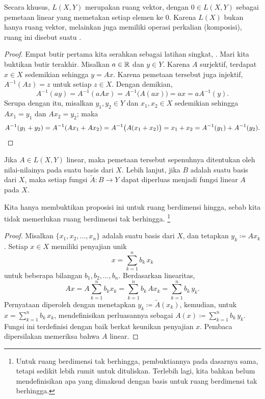 Secara khusus, $L(X,Y)$ merupakan ruang vektor, dengan $0 \in L(X,Y)$ sebagai
pemetaan linear yang memetakan setiap elemen ke $0$.
Karena $L(X)$ bukan hanya ruang vektor, melainkan juga
memiliki operasi perkalian (komposisi),
ruang ini disebut suatu \emph{}.

\begin{proof}
Empat butir pertama kita serahkan sebagai latihan singkat,
.
Mari kita buktikan butir terakhir.
Misalkan $a \in {\mathbb{R}}$ dan $y \in Y$.  Karena $A$ surjektif, terdapat 
$x \in X$ sedemikian sehingga $y = Ax$.
Karena pemetaan tersebut juga injektif, $A^{-1}(Az) = z$ untuk setiap $z \in X$.
Dengan demikian,
\begin{equation*}
A^{-1}(ay)
=
A^{-1}(aAx)
=
A^{-1}\bigl(A(ax)\bigr)
= ax
= aA^{-1}(y).
\end{equation*}
Serupa dengan itu, misalkan $y_1,y_2 \in Y$ dan $x_1, x_2 \in X$ sedemikian sehingga
$Ax_1 = y_1$ dan 
$Ax_2 = y_2$; maka
\begin{equation*}
A^{-1}(y_1+y_2)
=
A^{-1}(Ax_1+Ax_2)
=
A^{-1}\bigl(A(x_1+x_2)\bigr)
= x_1+x_2
= A^{-1}(y_1) + A^{-1}(y_2). \qedhere
\end{equation*}
\end{proof}

\begin{prop} \label{mv:lindefonbasis}
Jika $A \in L(X,Y)$ linear, maka pemetaan tersebut sepenuhnya ditentukan
oleh nilai-nilainya pada suatu basis dari $X$.
Lebih lanjut, jika $B$ adalah suatu basis dari $X$,
maka setiap fungsi $\widetilde{A} \colon B \to Y$ dapat diperluas menjadi fungsi
linear $A$ pada $X$.
\end{prop}

Kita hanya membuktikan proposisi ini untuk ruang berdimensi hingga, sebab kita
tidak memerlukan ruang berdimensi tak berhingga.%
\footnote{Untuk ruang berdimensi tak berhingga, pembuktiannya pada dasarnya sama, tetapi
sedikit lebih rumit untuk dituliskan.
Terlebih lagi, kita bahkan belum mendefinisikan apa yang dimaksud dengan basis untuk
ruang berdimensi tak berhingga.}

\begin{proof}
Misalkan $\{ x_1, x_2, \ldots, x_n \}$ adalah suatu basis dari $X$, dan tetapkan 
$y_k \coloneqq A x_k$.  Setiap $x \in X$ memiliki penyajian unik
\begin{equation*}
x = \sum_{k=1}^n b_k \, x_k
\end{equation*}
untuk beberapa bilangan $b_1,b_2,\ldots,b_n$.  Berdasarkan linearitas,
\begin{equation*}
Ax = 
A\sum_{k=1}^n b_k x_k
=
\sum_{k=1}^n b_k \, Ax_k
=
\sum_{k=1}^n b_k \, y_k .
\end{equation*}
Pernyataan  diperoleh dengan menetapkan $y_k \coloneqq \widetilde{A}(x_k)$,
kemudian, untuk 
$x = \sum_{k=1}^n b_k \, x_k$,
mendefinisikan perluasannya sebagai
$A(x) \coloneqq \sum_{k=1}^n b_k \, y_k$.  Fungsi ini terdefinisi dengan baik berkat
keunikan penyajian $x$.
Pembaca dipersilakan memeriksa bahwa $A$ linear.
\end{proof}

